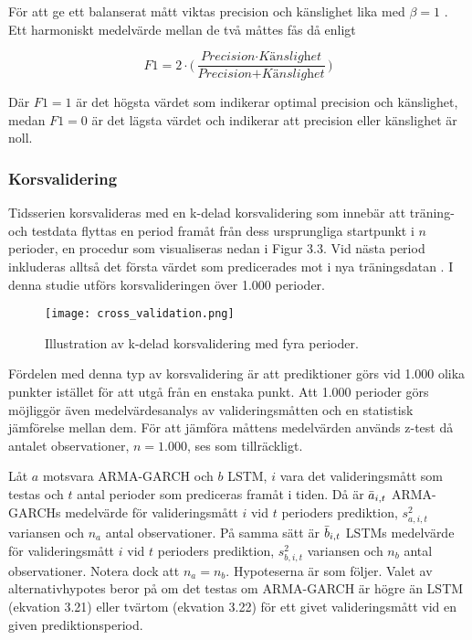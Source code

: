 \documentclass[11pt]{article}
\numberwithin{equation}{section}
\numberwithin{table}{section}
\numberwithin{figure}{section}
\begin{document}
För att ge ett balanserat mått viktas precision och känslighet lika med $\beta=1$ \parencite{ModelValidation}. Ett harmoniskt medelvärde mellan de två måttes fås då enligt

\begin{equation}
    \textit{F1} = 2 \cdot \Big( \frac{\textit{Precision} \cdot \textit{Känslighet}}{\textit{Precision} + \textit{Känslighet}} \Big)
\end{equation}

Där $F1=1$ är det högsta värdet som indikerar optimal precision och känslighet, medan $F1=0$ är det lägsta värdet och indikerar att precision eller känslighet är noll.


\subsubsection{Korsvalidering}
Tidsserien korsvalideras med en k-delad korsvalidering som innebär att träning- och testdata flyttas en period framåt från dess ursprungliga startpunkt i $n$ perioder, en procedur som visualiseras nedan i Figur 3.3. Vid nästa period inkluderas alltså det första värdet som predicerades mot i nya träningsdatan \parencite{bergmeir2018note}. I denna studie utförs korsvalideringen över 1.000 perioder. 

\begin{figure}[H]
\caption{Illustration av k-delad korsvalidering med fyra perioder.}
\texttt{[image: cross\_validation.png]}
\centering
\end{figure}


Fördelen med denna typ av korsvalidering är att prediktioner görs vid 1.000 olika punkter istället för att utgå från en enstaka punkt. Att 1.000 perioder görs möjliggör även medelvärdesanalys av valideringsmåtten och en statistisk jämförelse mellan dem. För att jämföra måttens medelvärden används z-test då antalet observationer, $n=1.000$, ses som tillräckligt.

Låt $a$ motsvara ARMA-GARCH och $b$ LSTM, $i$ vara det valideringsmått som testas och $t$ antal perioder som prediceras framåt i tiden. Då är $\Bar{a}_{i,t}$ ARMA-GARCHs medelvärde för valideringsmått $i$ vid $t$ perioders prediktion, $s_{a,i,t}^2$ variansen och $n_a$ antal observationer. På samma sätt är  $\Bar{b}_{i,t}$ LSTMs medelvärde för valideringsmått $i$ vid $t$ perioders prediktion, $s_{b,i,t}^2$ variansen och $n_b$ antal observationer. Notera dock att $n_a = n_b$. Hypoteserna är som följer. Valet av alternativhypotes beror på om det testas om ARMA-GARCH är högre än LSTM (ekvation 3.21) eller tvärtom (ekvation 3.22) för ett givet valideringsmått vid en given prediktionsperiod. 
\end{document}
